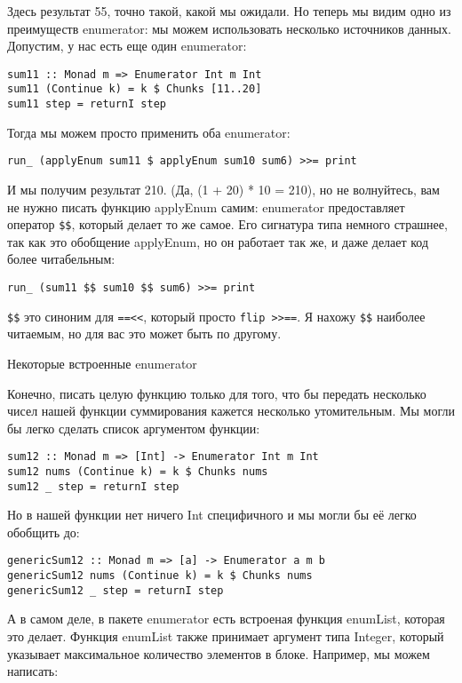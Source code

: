 Здесь результат 55, точно такой, какой мы ожидали. Но теперь мы видим одно из преимуществ enumerator: мы можем использовать несколько источников данных. Допустим, у нас есть еще один enumerator:

\begin{lstlisting}
sum11 :: Monad m => Enumerator Int m Int
sum11 (Continue k) = k $ Chunks [11..20]
sum11 step = returnI step
\end{lstlisting}

Тогда мы можем просто применить оба enumerator:

\begin{lstlisting}
run_ (applyEnum sum11 $ applyEnum sum10 sum6) >>= print
\end{lstlisting}

И мы получим результат 210. (Да, (1 + 20) * 10 = 210), но не волнуйтесь, вам не нужно писать функцию applyEnum самим: enumerator предоставляет оператор \lstinline'$$', который делает то же самое. Его сигнатура типа немного страшнее, так как это обобщение applyEnum, но он работает так же, и даже делает код более читабельным:

\begin{lstlisting}
run_ (sum11 $$ sum10 $$ sum6) >>= print
\end{lstlisting}

\lstinline'$$' это синоним для \lstinline'==<<', который просто \lstinline'flip >>=='. Я нахожу \lstinline'$$' наиболее читаемым, но для вас это может быть по другому.

Некоторые встроенные enumerator

Конечно, писать целую функцию только для того, что бы передать несколько чисел нашей функции суммирования кажется несколько утомительным. Мы могли бы легко сделать список аргументом функции:

\begin{lstlisting}
sum12 :: Monad m => [Int] -> Enumerator Int m Int
sum12 nums (Continue k) = k $ Chunks nums
sum12 _ step = returnI step
\end{lstlisting}

Но в нашей функции нет ничего Int специфичного и мы могли бы её легко обобщить до:

\begin{lstlisting}
genericSum12 :: Monad m => [a] -> Enumerator a m b
genericSum12 nums (Continue k) = k $ Chunks nums
genericSum12 _ step = returnI step
\end{lstlisting}

А в самом деле, в пакете enumerator есть встроеная функция enumList, которая это делает. Функция enumList также принимает аргумент типа Integer, который указывает максимальное количество элементов в блоке. Например, мы можем написать:

